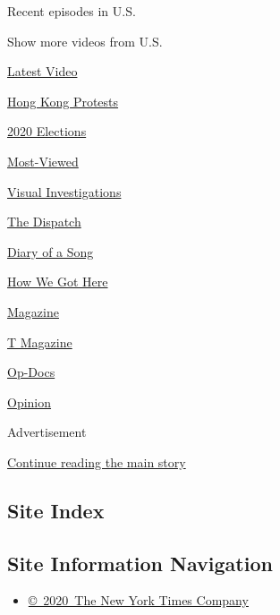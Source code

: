 Recent episodes in U.S.

Show more videos from U.S.

\href{/video}{}

\href{/video/latest-video}{Latest Video}

\href{/video/hk-protest}{Hong Kong Protests}

\href{/video/2020-Elections}{2020 Elections}

\href{/video/Most-Viewed}{Most-Viewed}

\href{/video/investigations}{Visual Investigations}

\href{/video/on-the-ground}{The Dispatch}

\href{/video/diaryofasong}{Diary of a Song}

\href{/video/how-we-got-here}{How We Got Here}

\href{/video/magazine}{Magazine}

\href{/video/t-magazine}{T Magazine}

\href{/video/op-docs}{Op-Docs}

\href{/video/opinion}{Opinion}

Advertisement

\protect\hyperlink{after-bottom}{Continue reading the main story}

\hypertarget{site-index}{%
\subsection{Site Index}\label{site-index}}

\hypertarget{site-information-navigation}{%
\subsection{Site Information
Navigation}\label{site-information-navigation}}

\begin{itemize}
\tightlist
\item
  \href{https://help.nytimes3xbfgragh.onion/hc/en-us/articles/115014792127-Copyright-notice}{©~2020~The
  New York Times Company}
\end{itemize}

